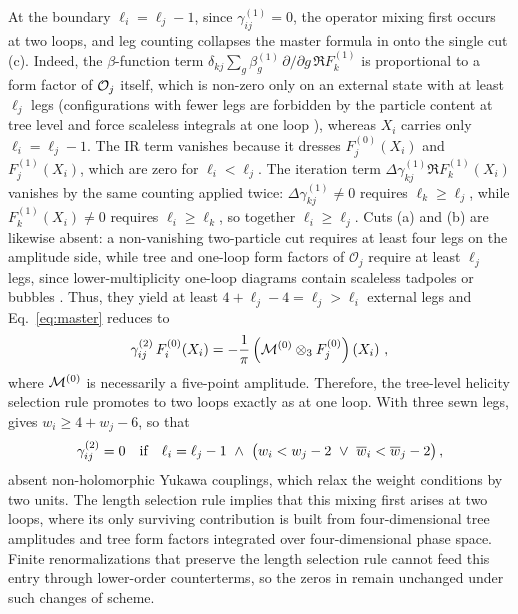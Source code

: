 At the boundary $\ell_i = \ell_j - 1$, since $\gamma_{ij}^{(1)} = 0$, the operator mixing first occurs at two loops, and leg counting collapses the master formula in  onto the single cut (c).
Indeed, the $\beta$-function term $\delta_{kj}\sum_g\beta^{(1)}_g\,\partial/\partial g\,\Re F^{(1)}_k$ is proportional to a form factor of $\mathcal{O}_j$ itself, which is non-zero only on an external state with at least $\ell_j$ legs (configurations with fewer legs are forbidden by the particle content at tree level and force scaleless integrals at one loop \cite{Bern:2019wie}), whereas $X_i$ carries only $\ell_i=\ell_j-1$.
The IR term vanishes because it dresses $F^{(0)}_j(X_i)$ and $F^{(1)}_j(X_i)$, which are zero for $\ell_i < \ell_j$.
The iteration term $\Delta\gamma^{(1)}_{kj}\Re F^{(1)}_k(X_i)$ vanishes by the same counting applied twice: $\Delta\gamma^{(1)}_{kj}\neq0$ requires $\ell_k\ge\ell_j$, while $F^{(1)}_k(X_i)\neq0$ requires $\ell_i\ge\ell_k$, so together $\ell_i\ge\ell_j$.
Cuts (a) and (b) are likewise absent: a non-vanishing two-particle cut requires at least four legs on
the amplitude side, while tree and one-loop form factors of $\mathcal O_j$ require at least $\ell_j$
legs, since lower-multiplicity one-loop diagrams contain scaleless tadpoles or bubbles
\cite{Bern:2019wie,Bern:2020ikv,EliasMiro:2020tdv,Caron-Huot:2016cwu,EliasMiro:2021jgu}. Thus, they
yield at least $4+\ell_j-4=\ell_j>\ell_i$ external legs and Eq.~\eqref{eq:master} reduces to
\begin{equation}
    \gamma_{ij}^{(2)}\, F_{i}^{(0)}(X_i) = -\frac{1}{\pi} \left(\mathcal{M}^{(0)} \otimes_3  F^{(0)}_j\right)\left(X_i\right)\,,
\end{equation}
where $\mathcal{M}^{(0)}$ is necessarily a five-point amplitude.
Therefore, the tree-level helicity selection rule promotes to two loops exactly as at one loop. With three sewn legs,  gives $w_i \ge 4 + w_j - 6$, so that
\begin{equation}
\label{eq:dl1}
    \gamma^{(2)}_{ij} = 0 \ \ \ \text{if} \ \ \ \ell_i = \ell_j - 1 \ \land \  \big(w_i < w_j - 2  \ \lor  \ \wb_i < \wb_j - 2\big) \,,
\end{equation}
absent non-holomorphic Yukawa couplings, which relax the weight conditions by two units.
%
The length selection rule implies that this mixing first arises at two loops, where its only
surviving contribution is built from four-dimensional tree amplitudes and tree form factors
integrated over four-dimensional phase space.
Finite renormalizations that preserve the length selection rule cannot feed this entry through
lower-order counterterms, so the zeros in  remain unchanged under such changes of scheme.

